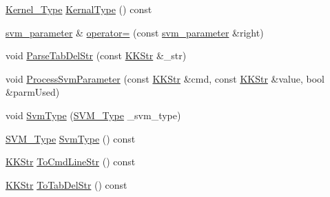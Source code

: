 \begin{DoxyCompactItemize}
\hyperlink{namespace_s_v_m289___b_f_s_aad17f5250658b3fe42ba842df2ef2c6d}{Kernel\+\_\+\+Type} \hyperlink{struct_s_v_m289___b_f_s_1_1svm__parameter_a982787a1162f765320d127ff0a915db3}{Kernal\+Type} () const 
\item 
\hyperlink{struct_s_v_m289___b_f_s_1_1svm__parameter}{svm\+\_\+parameter} \& \hyperlink{struct_s_v_m289___b_f_s_1_1svm__parameter_ad3c986472cba487fcd4fd2cbd5515d6f}{operator=} (const \hyperlink{struct_s_v_m289___b_f_s_1_1svm__parameter}{svm\+\_\+parameter} \&right)
\item 
void \hyperlink{struct_s_v_m289___b_f_s_1_1svm__parameter_af4e531b3258a895e9f3e19f3e5abef46}{Parse\+Tab\+Del\+Str} (const \hyperlink{class_k_k_b_1_1_k_k_str}{K\+K\+Str} \&\+\_\+str)
\item 
void \hyperlink{struct_s_v_m289___b_f_s_1_1svm__parameter_aa7d24d6b2db6f9dc1b34b27680de9f07}{Process\+Svm\+Parameter} (const \hyperlink{class_k_k_b_1_1_k_k_str}{K\+K\+Str} \&cmd, const \hyperlink{class_k_k_b_1_1_k_k_str}{K\+K\+Str} \&value, bool \&parm\+Used)
\item 
void \hyperlink{struct_s_v_m289___b_f_s_1_1svm__parameter_a912df0152cd4456f881d4e24e21a7ee2}{Svm\+Type} (\hyperlink{namespace_s_v_m289___b_f_s_a0dbbe5a38e648f011aedb361a8c48913}{S\+V\+M\+\_\+\+Type} \+\_\+svm\+\_\+type)
\item 
\hyperlink{namespace_s_v_m289___b_f_s_a0dbbe5a38e648f011aedb361a8c48913}{S\+V\+M\+\_\+\+Type} \hyperlink{struct_s_v_m289___b_f_s_1_1svm__parameter_afd1bb979ff59718af4987e843e88a7c5}{Svm\+Type} () const 
\item 
\hyperlink{class_k_k_b_1_1_k_k_str}{K\+K\+Str} \hyperlink{struct_s_v_m289___b_f_s_1_1svm__parameter_a86997f97781e4035d26c264edf080ce2}{To\+Cmd\+Line\+Str} () const 
\item 
\hyperlink{class_k_k_b_1_1_k_k_str}{K\+K\+Str} \hyperlink{struct_s_v_m289___b_f_s_1_1svm__parameter_a60145fb59f20c8099ef08e0bf265c324}{To\+Tab\+Del\+Str} () const 
\end{DoxyCompactItemize}
